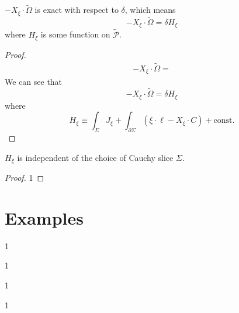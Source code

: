\documentclass[10pt]{article}
\begin{document}
\begin{claim}
    $-X_\xi\cdot\tilde{\Omega}$ is exact with respect to $\delta$, which means
    \begin{equation}
        -X_\xi\cdot\tilde{\Omega}=\delta H_{\xi}
    \end{equation}
    where $H_{\xi}$ is some function on $\tilde{\mathcal{P}}$.
\end{claim}
\begin{proof}
    \begin{equation}
        \begin{split}
            -X_\xi\cdot\tilde{\Omega}=
        \end{split}
    \end{equation}
    We can see that
    \begin{equation}
        -X_\xi\cdot\tilde{\Omega}=\delta H_\xi
    \end{equation}
    where
    \begin{equation}
        H_\xi\equiv\int_{\Sigma}J_{\xi}+\int_{\partial\Sigma}(\xi\cdot\ell-X_\xi\cdot C)+\text{const.}
    \end{equation}

\end{proof}

\begin{claim}
    $H_\xi$ is independent of the choice of Cauchy slice $\Sigma$.
\end{claim}
\begin{proof}
    1
\end{proof}

\section{Examples}
\begin{example}
    1
\end{example}

\begin{example}
    1
\end{example}

\begin{example}
    1
\end{example}

\begin{example}
    1
\end{example}

\clearpage


\end{document}
